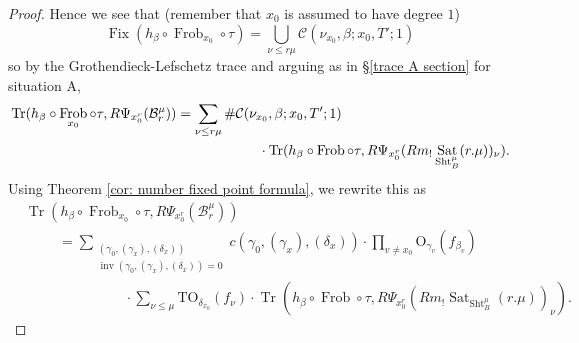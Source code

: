 \documentclass[reqno]{amsart}
\numberwithin{equation}{section}
\newcommand{\Cal}[1]{\mathcal{#1}}
\newcommand{\mrm}[1]{\mathrm{#1}}
\DeclareMathOperator{\Frob}{Frob}
\DeclareMathOperator{\Tr}{Tr}
\DeclareMathOperator{\inv}{inv}
\DeclareMathOperator{\Fix}{Fix}
\DeclareMathOperator{\Sht}{Sht}
\DeclareMathOperator{\Sat}{Sat}
\theoremstyle{remark}
\numberwithin{equation}{section}
\begin{document}
\begin{proof}
Hence we see that (remember that $x_0$ is assumed to have degree $1$)
\[
\Fix(h_{\beta} \circ \Frob_{x_0} \circ  \tau)   = \bigcup_{\nu \leq r\mu} \Cal{C}(\nu_{x_0}, \beta; x_0,T'; 1)
\]
so by the Grothendieck-Lefschetz trace and arguing as in \S \ref{trace A section} for situation A, 
\begin{align*}
&\Tr( h_{\beta} \circ \Frob_{x_0} \circ  \tau , R\Psi_{x_0^r}(\Cal{B}_r^{\mu}))  = \sum_{\nu \leq r\mu} \# \Cal{C}(\nu_{x_0}, \beta; x_0,T'; 1) \\
&  \hspace{2.5in} \cdot  \Tr( h_{\beta} \circ \Frob \circ  \tau,  R\Psi_{x_0^r}( Rm_!\Sat_{\Sht_B^{\mu}}(r.\mu))_{\nu}).
\end{align*}
Using Theorem \ref{cor: number fixed point formula}, we rewrite this as 
\begin{align}\label{B eq 1}
&
\Tr( h_{\beta} \circ \Frob_{x_0} \circ  \tau , R\Psi_{x_0^r}(\Cal{B}_r^{\mu}))   \nonumber \\
& \hspace{1cm} =  \sum_{\substack{ (\gamma_0, (\gamma_x),(\delta_x)) \nonumber \\ \inv(\gamma_0, (\gamma_x),(\delta_x) ) = 0  }} 
c(\gamma_0, (\gamma_x), (\delta_x))   \cdot \prod_{v \neq x_0} \mrm{O}_{\gamma_v}(f_{\beta_v}) \nonumber \\
& \hspace{3cm} \cdot \sum_{\nu \leq \mu}  \mrm{TO}_{\delta_{x_0}}(f_{\nu})  \cdot \Tr(h_{\beta} \circ \Frob \circ  \tau, R\Psi_{x_0^r}(Rm_! \Sat_{\Sht_B^{\mu}}(r.\mu))_{\nu}) .
\end{align}


\end{proof}
\end{document}
